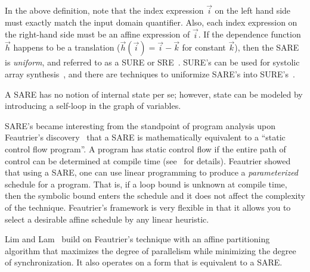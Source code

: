 In the above definition, note that the index expression ${\vec i}$ on
the left hand side must exactly match the input domain quantifier.
Also, each index expression on the right-hand side must be an affine
expression of ${\vec i}$.  If the dependence function ${\vec h}$
happens to be a translation (${\vec h}({\vec i}) = {\vec i} - {\vec
k}$ for constant ${\vec k}$), then the SARE is {\it uniform}, and
referred to as a SURE or SRE~\cite{Karp67}. SURE's can be used for
systolic array synthesis~\cite{Quinton84}, and there are techniques to
uniformize SARE's into SURE's~\cite{Manjun00}.

A SARE has no notion of internal state per se; however, state can be
modeled by introducing a self-loop in the graph of variables.

SARE's became interesting from the standpoint of program analysis upon
Feautrier's discovery~\cite{Feautrier92i,Feautrier92ii} that a SARE is
mathematically equivalent to a ``static control flow program''.  A
program has static control flow if the entire path of control can be
determined at compile time (see~\cite{Feautrier92i,DRV00} for details).
Feautrier showed that using a SARE, one can use linear programming to
produce a {\it parameterized} schedule for a program.  That is, if a
loop bound is unknown at compile time, then the symbolic bound enters
the schedule and it does not affect the complexity of the technique.
Feautrier's framework is very flexible in that it allows you to select
a desirable affine schedule by any linear heuristic.

Lim and Lam~\cite{Lim01} build on Feautrier's technique with an affine
partitioning algorithm that maximizes the degree of parallelism while
minimizing the degree of synchronization.  It also operates on a form
that is equivalent to a SARE.
